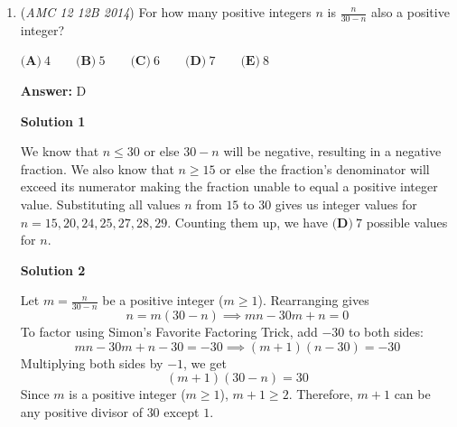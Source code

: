 \begin{enumerate}
 $\textbf{(A)}\ 30\qquad\textbf{(B)}\ 32\qquad\textbf{(C)}\ 36\qquad\textbf{(D)}\ 40\qquad\textbf{(E)}\ 50$

 \textbf{Answer: }D



\textbf{Solution}

Let the size of Ed's drink equal $x$ ounces, and let the size of Ann's drink equal $\frac{3}{2}x$ ounces.  After both consume $\frac{3}{4}$ of their drinks, Ed and Ann have $\frac{x}{4}$  and $\frac{3x}{8}$ ounces of their drinks remaining.  Ann gives away $\frac{x}{8} + 2$ ounces to Ed.

 In the end, Ed drank everything in his original lemonade plus what Ann gave him, and Ann drank everything in her original lemonade minus what she gave Ed. Thus we have
 \[x + \frac{x}{8} + 2 = \frac{3x}{2} - \frac{x}{8} - 2\]
 \[x = 16\]The total amount the two of them drank is simply 
 \[x + \frac{3}{2}x = 16 + 24 = \boxed{\textbf{(D)}\ 40}\]



	\item (\textit{AMC 12 12B 2014}) For how many positive integers $n$ is $\frac{n}{30-n}$ also a positive integer?


 $\textbf{(A)}\ 4\qquad\textbf{(B)}\ 5\qquad\textbf{(C)}\ 6\qquad\textbf{(D)}\ 7\qquad\textbf{(E)}\ 8$

 \textbf{Answer: }D



\textbf{Solution 1}

We know that $n \le 30$ or else $30-n$ will be negative, resulting in a negative fraction.  We also know that $n \ge 15$ or else the fraction's denominator will exceed its numerator making the fraction unable to equal a positive integer value.  Substituting all values $n$ from $15$ to $30$ gives us integer values for $n=15, 20, 24, 25, 27, 28, 29$.  Counting them up, we have $\boxed{\textbf{(D)}\ 7}$ possible values for $n$.  

 



\textbf{Solution 2}

Let $m = \frac{n}{30-n}$ be a positive integer ($m \ge 1$). Rearranging gives
 \[n = m(30 - n) \implies mn - 30m + n = 0\]To factor using Simon's Favorite Factoring Trick, add $-30$ to both sides:
 \[mn - 30m + n - 30 = -30 \implies (m + 1)(n - 30) = -30\]Multiplying both sides by $-1$, we get
 \[(m + 1)(30 - n) = 30\]Since $m$ is a positive integer ($m \ge 1$), $m + 1 \ge 2$. Therefore, $m + 1$ can be any positive divisor of $30$ except $1$.


\end{enumerate}
